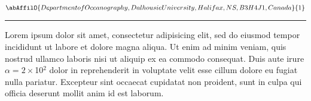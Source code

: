 \begin{center}
   \vspace{2 mm} \begin{center}
    \vspace{2 mm}\begin{center}
  
  $\abAffilO{Department of Oceanography, Dalhousie University, Halifax, NS, B3H 4J1, Canada}{1}$

  \end{center}
  \vspace{2 mm}
  \end{center}\end{center}
  \begin{center}\rule{0.70\linewidth}{0.5 pt}\end{center}

\noindent Lorem ipsum dolor sit amet, consectetur adipisicing elit, sed do eiusmod tempor incididunt ut labore et dolore magna aliqua. Ut enim ad minim veniam, quis nostrud \slexercitation\rm ullamco laboris nisi ut aliquip ex ea commodo consequat. Duis aute irure $\alpha=2\times$10$^2$ dolor in reprehenderit in voluptate velit esse cillum dolore eu fugiat nulla pariatur. Excepteur sint occaecat cupidatat non proident, sunt in culpa qui officia deserunt mollit anim id est laborum.

